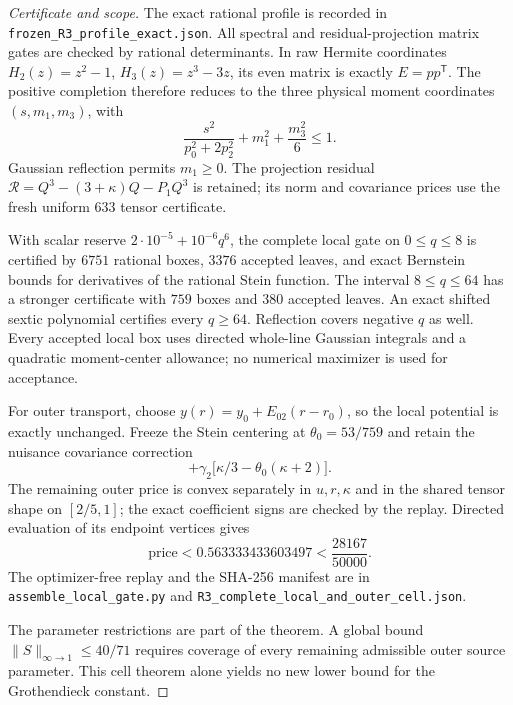 \begin{proof}[Certificate and scope]
The exact rational profile is recorded in
\texttt{frozen\_R3\_profile\_exact.json}.  All spectral and residual-projection
matrix gates are checked by rational determinants.  In raw Hermite
coordinates $H_2(z)=z^2-1$, $H_3(z)=z^3-3z$, its even matrix is exactly
$E=pp^{\mathsf T}$.  The positive completion therefore reduces to the three
physical moment coordinates $(s,m_1,m_3)$, with
\[
 \frac{s^2}{p_0^2+2p_2^2}+m_1^2+\frac{m_3^2}{6}\le1.
\]
Gaussian reflection permits $m_1\ge0$.  The projection residual
$\mathcal R=Q^3-(3+\kappa)Q-P_1Q^3$ is retained; its norm and covariance
prices use the fresh uniform $633$ tensor certificate.

With scalar reserve $2\cdot10^{-5}+10^{-6}q^6$, the complete local gate on
$0\le q\le8$ is certified by $6751$ rational boxes, $3376$ accepted leaves,
and exact Bernstein bounds for derivatives of the rational Stein function.
The interval $8\le q\le64$ has a stronger certificate with $759$ boxes and
$380$ accepted leaves.  An exact shifted sextic polynomial certifies every
$q\ge64$.  Reflection covers negative $q$ as well.  Every accepted local box
uses directed whole-line Gaussian integrals and a quadratic moment-center
allowance; no numerical maximizer is used for acceptance.

For outer transport, choose
$y(r)=y_0+E_{02}(r-r_0)$, so the local potential is exactly unchanged.
Freeze the Stein centering at $\theta_0=53/759$ and retain the nuisance
covariance correction
\[
 +\gamma_2\bigl[\kappa/3-\theta_0(\kappa+2)\bigr].
\]
The remaining outer price is convex separately in $u,r,\kappa$ and in the
shared tensor shape on $[2/5,1]$; the exact coefficient signs are checked by
the replay.  Directed evaluation of its endpoint vertices gives
\[
 \text{price}<0.563333433603497<\frac{28167}{50000}.
\]
The optimizer-free replay and the SHA-256 manifest are in
\texttt{assemble\_local\_gate.py} and
\texttt{R3\_complete\_local\_and\_outer\_cell.json}.

The parameter restrictions are part of the theorem.  A global bound
$\|S\|_{\infty\to1}\le40/71$ requires coverage of every remaining admissible
outer source parameter.  This cell theorem alone yields no new lower bound
for the Grothendieck constant.
\end{proof}

